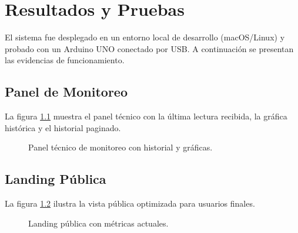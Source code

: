 \documentclass[12pt,a4paper]{report}
\begin{document}
\chapter{Resultados y Pruebas}
\label{ch:resultados}

El sistema fue desplegado en un entorno local de desarrollo (macOS/Linux) y probado con un Arduino UNO conectado por USB. A continuación se presentan las evidencias de funcionamiento.

\section{Panel de Monitoreo}
\label{sec:resultado-monitor}

La figura \ref{fig:monitor} muestra el panel técnico con la última lectura recibida, la gráfica histórica y el historial paginado.

\begin{figure}[H]
    \centering
    \caption{Panel técnico de monitoreo con historial y gráficas.}
    \label{fig:monitor}
\end{figure}

\section{Landing Pública}
\label{sec:resultado-landing}

La figura \ref{fig:landing} ilustra la vista pública optimizada para usuarios finales.

\begin{figure}[H]
    \centering
    \caption{Landing pública con métricas actuales.}
    \label{fig:landing}
\end{figure}
\end{document}
